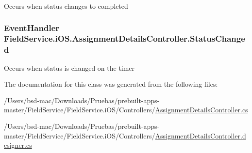 Occurs when status changes to completed 

\hypertarget{class_field_service_1_1i_o_s_1_1_assignment_details_controller_afbf3477f419b5cf67a6daa8d7846b3ca}{
\subsubsection[{Status\+Changed}]{\setlength{\rightskip}{0pt plus 5cm}Event\+Handler Field\+Service.\+i\+O\+S.\+Assignment\+Details\+Controller.\+Status\+Changed}}\label{class_field_service_1_1i_o_s_1_1_assignment_details_controller_afbf3477f419b5cf67a6daa8d7846b3ca}


Occurs when status is changed on the timer 



The documentation for this class was generated from the following files\+:\begin{DoxyCompactItemize}
\item 
/\+Users/bsd-\/mac/\+Downloads/\+Pruebas/prebuilt-\/apps-\/master/\+Field\+Service/\+Field\+Service.\+i\+O\+S/\+Controllers/\hyperlink{_assignment_details_controller_8cs}{Assignment\+Details\+Controller.\+cs}\item 
/\+Users/bsd-\/mac/\+Downloads/\+Pruebas/prebuilt-\/apps-\/master/\+Field\+Service/\+Field\+Service.\+i\+O\+S/\+Controllers/\hyperlink{_assignment_details_controller_8designer_8cs}{Assignment\+Details\+Controller.\+designer.\+cs}\end{DoxyCompactItemize}
